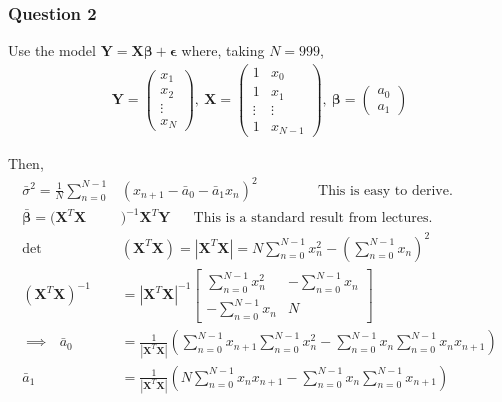 \documentclass[12pt, a4paper]{article}
\begin{document}
\subsubsection*{Question 2}

Use the model $\bm{Y} = \bm{X\beta} + \bm{\epsilon}$  where, taking $N = 999$,
\begin{align*}
	\bm{Y} = \begin{pmatrix}
		x_{1} \\
		x_{2} \\
		\vdots \\
		x_{N}
	\end{pmatrix}, ~ 
	\bm{X} = \begin{pmatrix}
		1 & x_{0} \\
		1 & x_{1} \\
		\vdots & \vdots \\
		1 & x_{N-1}
	\end{pmatrix}, ~ 
	\bm{\beta} = \begin{pmatrix}
		a_{0} \\
		a_{1}
	\end{pmatrix}
\end{align*}

Then,
\begin{align}
	\bar{\sigma}^{2} = \frac{1}{N} \sum_{n = 0}^{N-1}&(x_{n+1}-\bar{a}_{0}-\bar{a}_{1}x_{n})^{2} \text{ ~~~~~~~~~~~ This  is easy to derive.} \\
	\bm{\bar{\beta}} = (\bm{X}^{T}\bm{X}&)^{-1}\bm{X}^{T}\bm{Y} \text{ ~~~ This is a standard result from lectures.} \nonumber\\
	\text{det} & (\bm{X}^{T}\bm{X}) = |\bm{X}^{T}\bm{X}| = N\sum\limits_{n=0}^{N-1}x_{n}^{2}- \left(\sum\limits_{n=0}^{N-1}x_{n}\right)^{2} \nonumber\\
	(\bm{X}^{T}\bm{X})^{-1} & = |\bm{X}^{T}\bm{X}|^{-1}
	\begin{bmatrix} 
		\sum\limits_{n=0}^{N-1}x_{n}^{2} & -\sum_{n=0}^{N-1}x_{n} \\
		-\sum\limits_{n=0}^{N-1}x_{n} & N
	\end{bmatrix} \nonumber\\
	\implies ~~~
	\bar{a}_{0} & = \frac{1}{ |\bm{X}^{T}\bm{X}| } \left( \sum\limits_{n=0}^{N-1}x_{n+1}\sum\limits_{n=0}^{N-1}x_{n}^{2} - \sum\limits_{n=0}^{N-1}x_{n}\sum\limits_{n=0}^{N-1}x_{n}x_{n+1} \right) \\
	\bar{a}_{1} & = \frac{1}{ |\bm{X}^{T}\bm{X}| } \left( N\sum\limits_{n=0}^{N-1}x_{n}x_{n+1} - \sum\limits_{n=0}^{N-1}x_{n}\sum\limits_{n=0}^{N-1}x_{n+1} \right)
\end{align}
\end{document}
